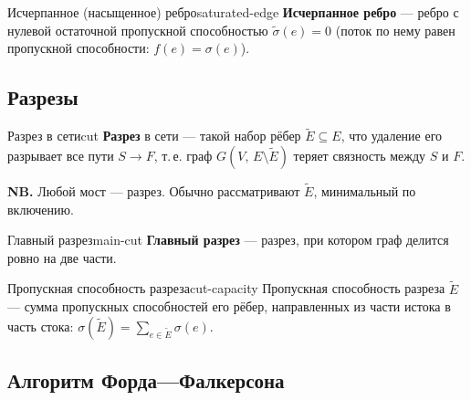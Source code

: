 \begin{defn}{Исчерпанное (насыщенное) ребро}{saturated-edge}
\textbf{Исчерпанное ребро} --- ребро с нулевой остаточной пропускной способностью
$\tilde{\sigma}(e) = 0$ (поток по нему равен пропускной способности: $f(e) = \sigma(e)$).
\end{defn}

\subsection*{Разрезы}

\begin{defn}{Разрез в сети}{cut}
\textbf{Разрез} в сети --- такой набор рёбер $\tilde{E} \subseteq E$, что удаление его
разрывает все пути $S \to F$, т.\,е. граф $G(V,\, E \setminus \tilde{E})$ теряет
связность между $S$ и $F$.

\medskip
\textbf{NB.} Любой мост --- разрез. Обычно рассматривают $\tilde{E}$, минимальный
по включению.
\end{defn}

\begin{defn}{Главный разрез}{main-cut}
\textbf{Главный разрез} --- разрез, при котором граф делится ровно на две части.
\end{defn}

\begin{defn}{Пропускная способность разреза}{cut-capacity}
Пропускная способность разреза $\tilde{E}$ --- сумма пропускных способностей его рёбер,
направленных из части истока в часть стока:
$\displaystyle \sigma(\tilde{E}) = \sum_{e \in \tilde{E}} \sigma(e)$.
\end{defn}

\subsection*{Алгоритм Форда—Фалкерсона}

